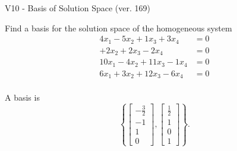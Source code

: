\begin{exercise}
  \begin{exerciseTitle}V10 - Basis of Solution Space (ver. 169)\end{exerciseTitle}
  \begin{exerciseStatement}
    Find a basis for the solution space of the homogeneous system 
\begin{align*}
 4 x_ 1 -5 x_ 2 + 1 x_ 3 + 3 x_ 4 &= 0  \\ 
  + 2 x_ 2 + 2 x_ 3 -2 x_ 4 &= 0  \\ 
  10 x_ 1 -4 x_ 2 + 11 x_ 3 -1 x_ 4 &= 0  \\ 
  6 x_ 1 + 3 x_ 2 + 12 x_ 3 -6 x_ 4 &= 0  \\ 
 \end{align*}


 
  \end{exerciseStatement}

  \begin{exerciseAnswer}
   A basis is   
\[\left\{\left[\begin{array}{c}
-\frac{3}{2} \\
-1 \\
1 \\
0
\end{array}\right] , \left[\begin{array}{c}
\frac{1}{2} \\
1 \\
0 \\
1
\end{array}\right]\right\}.\]

  


  \end{exerciseAnswer}
\end{exercise}